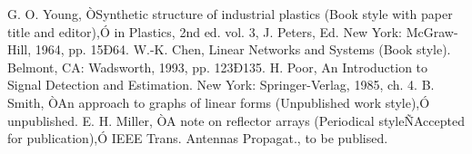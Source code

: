 \documentclass[a4paper, 10pt, conference]{ieeeconf}      %
\begin{document}
\begin{thebibliography}{99}

 G. O. Young, ÒSynthetic structure of industrial plastics (Book style with paper title and editor),Ó 	in Plastics, 2nd ed. vol. 3, J. Peters, Ed.  New York: McGraw-Hill, 1964, pp. 15Ð64.
 W.-K. Chen, Linear Networks and Systems (Book style).	Belmont, CA: Wadsworth, 1993, pp. 123Ð135.
 H. Poor, An Introduction to Signal Detection and Estimation.   New York: Springer-Verlag, 1985, ch. 4.
 B. Smith, ÒAn approach to graphs of linear forms (Unpublished work style),Ó unpublished.
 E. H. Miller, ÒA note on reflector arrays (Periodical styleÑAccepted for publication),Ó IEEE Trans. Antennas Propagat., to be publised.

\end{thebibliography}
\end{document}
